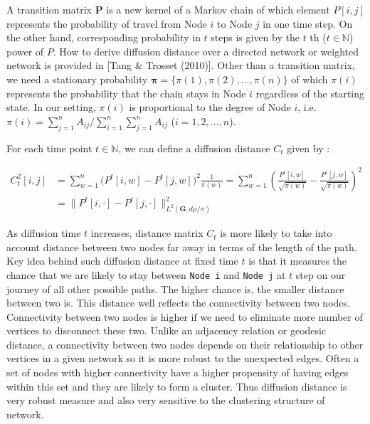 \documentclass[12pt]{article}
\theoremstyle{definition}
\begin{document}
A transition matrix $\mathbf{P}$ is a new kernel of a Markov chain of which element $P[i,j]$ represents the probability of travel from Node $i$ to Node $j$ in one time step. On the other hand, corresponding probability in $t$ steps is given by the $t$ th ($t \in \mathbb{N}$) power of $P$. How to derive diffusion distance over a directed network or weighted network is provided in [Tang $\&$ Trosset (2010)]. Other than a transition matrix, we need a stationary probability $\boldsymbol{\pi} = \{\pi(1), \pi(2), ... , \pi(n) \}$ of which $\pi(i)$ represents the probability that the chain stays in Node $i$ regardless of the starting state. In our setting, $\pi(i)$ is proportional to the degree of Node $i$, i.e. $\pi(i) = \sum\limits_{j=1}^{n} A_{ij} \big/ \sum\limits_{i=1}^{n}\sum\limits_{j=1}^{n} A_{ij}$ ($i=1,2,..., n$).   

For each time point $t \in \mathbb{N}$, we can define a diffusion distance $C_{t}$  given by :

\begin{equation}
\begin{split}
C^2_{t}[i,j] & = \sum\limits_{w =1}^{n} \big( P^{t}[i,w] - P^{t}[j,w]  \big)^{2} \frac{1}{\pi(w)} = \sum\limits_{w=1}^{n} \left(  \frac{P^{t}[i,w]}{\sqrt{\pi(w)}} - \frac{P^{t}[j,w]}{\sqrt{\pi(w)}}   \right)^2 \\ & = \parallel P^{t}[i, \cdot] - P^{t}[j, \cdot]  \parallel^2_{L^{2}(\boldsymbol{G}, d\mu / \pi)  }
\end{split}
\end{equation}

As diffusion time $t$ increases, distance matrix $C_{t}$ is more likely to take into account distance between two nodes far away in terms of the length of the path. Key idea behind such diffusion distance at fixed time $t$ is that it measures the chance that we are likely to stay between \texttt{Node i} and \texttt{Node j} at $t$ step on our journey of all other possible paths. The higher chance is, the smaller distance between two is. This distance well reflects the connectivity between two nodes. Connectivity between two nodes is higher if we need to eliminate more number of vertices to disconnect these two. Unlike an adjacency relation or geodesic distance, a connectivity between two nodes depends on their relationship to other vertices in a given network so it is more robust to the unexpected edges. Often a set of nodes with higher connectivity have a higher propensity of having edges within this set and they are likely to form a cluster. Thus diffusion distance is very robust measure and also very sensitive to the clustering structure of network. 
\end{document}
